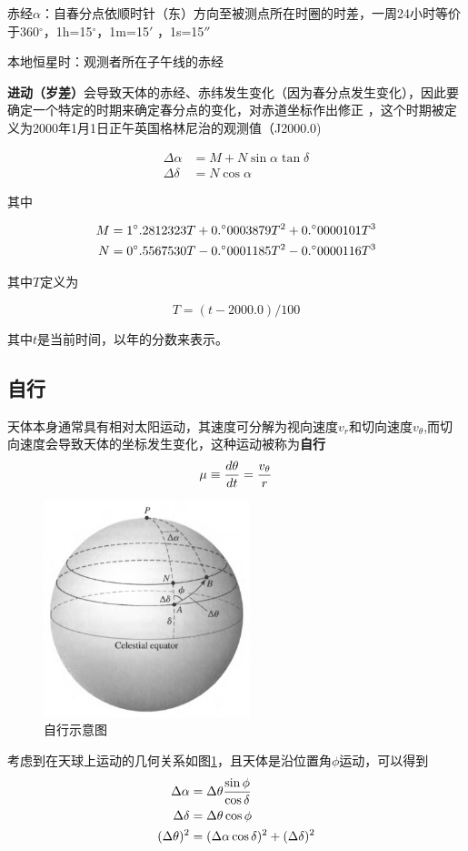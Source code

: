 赤经$\alpha$：自春分点依顺时针（东）方向至被测点所在时圈的时差，一周24小时等价于360$^\circ$，1h=15$^\circ$，1m=15$'$
，1s=15$''$

本地恒星时：观测者所在子午线的赤经

{\bf
进动（岁差）}会导致天体的赤经、赤纬发生变化（因为春分点发生变化），因此要确定一个特定的时期来确定春分点的变化，对赤道坐标作出修正
，这个时期被定义为2000年1月1日正午英国格林尼治的观测值（J2000.0)

\begin{align}
  \Delta\alpha &=M+N \sin\alpha \tan\delta \\
  \Delta\delta &=N\cos\alpha
\end{align}

其中

\begin{align}
  M &=1^\circ.2812323T+0.^\circ0003879T^2+0.^\circ0000101T^3 \notag \\
  N &=0^\circ.5567530T-0.^\circ0001185T^2-0.^\circ0000116T^3 \notag
\end{align}

其中$T$定义为

\begin{equation}
  T=(t-2000.0)/100
\end{equation}

其中$t$是当前时间，以年的分数来表示。

\subsection{自行}
天体本身通常具有相对太阳运动，其速度可分解为视向速度$v_r$和切向速度$v_\theta$,而切向速度会导致天体的坐标发生变化，这种运动被称为{\bf 自行}
\begin{displaymath}
  \mu\equiv{d\theta\over dt} ={v_\theta \over r}
\end{displaymath}

\begin{figure}[hbt]
  \centering
  \includegraphics[width=6cm]{chapters/01/propermotion}
  \caption{自行示意图}
  \label{fig:proper}
\end{figure}


考虑到在天球上运动的几何关系如图\ref{fig:proper}，且天体是沿位置角$\phi$运动，可以得到
\begin{align}
   \Delta\alpha &=\Delta\theta{\sin \phi \over \cos \delta}\\
   \Delta\delta &=\Delta\theta\cos\phi\\
   (\Delta\theta)^2 &=(\Delta\alpha\cos\delta)^2+(\Delta\delta)^2
\end{align}
